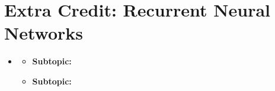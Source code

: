 
\section{Extra Credit: Recurrent Neural Networks}
\medskip
\begin{itemize}

    \item {}

    \begin{itemize}
    \item \textbf{Subtopic:}
    \item \textbf{Subtopic:}
    \end{itemize}

\end{itemize}


